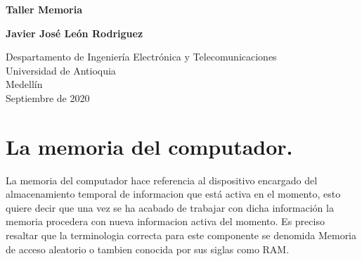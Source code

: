 \documentclass[12pt]{article}
\begin{document}
\large
\begin{titlepage}
    \begin{center}
        \vspace*{1cm}
            
        \Huge
        
        \textbf{Taller Memoria}
            
        \vspace{0.5cm}
        \LARGE
    
            
        \vspace{3cm}
            
        \textbf{Javier José León Rodriguez}
            
        \vfill
            
        \vspace{0.8cm}
            
        \Large
        Despartamento de Ingeniería Electrónica y Telecomunicaciones\\
        Universidad de Antioquia\\
        Medellín\\
        Septiembre de 2020
            
    \end{center}
\end{titlepage}

\tableofcontents
\vspace{0.5cm}
\section{La memoria del computador.}
La memoria del computador hace referencia al dispositivo encargado del almacenamiento temporal de informacion que está activa en el momento, esto quiere decir que una vez se ha acabado de trabajar con dicha información la memoria procedera con nueva informacion activa del momento. Es preciso resaltar que la terminologia correcta para este componente se denomida Memoria de acceso aleatorio o tambien conocida por sus siglas como RAM.

 \vspace{0.5cm}
 
\end{document}
